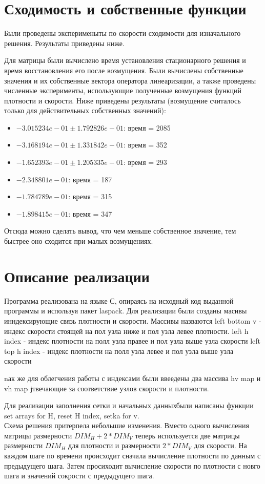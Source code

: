 \documentclass[a4paper, 25pt]{article}
\begin{document}
\newpage
\section{Сходимость и собственные функции}
Были проведены эксперименыты по скорости сходимости для изначального решения. Результаты приведены ниже.

Для матрицы были вычислено время установления стационарного решения и время восстановления его после возмущения. Были вычислены собственные значения
и их собственные вектора оператора линеаризации, а также проведены численные эксперименты, использующие полученные возмущения функций плотности и 
скорости. Ниже приведены результаты (возмущение считалось только для действительных собственных значений):
\begin{itemize}
 \item $-3.015234e-01 \pm 1.792826e-01$: время = 2085
 \item $-3.168194e-01 \pm 1.331842e-01$: время = 352
 \item $-1.652393e-01 \pm 1.205335e-01$: время = 293
 \item $-2.348801e-01$: время = 187
 \item $-1.784789e-01$: время = 315
 \item $-1.898415e-01$: время = 347 
\end{itemize}
Отсюда можно сделать вывод, что чем меньше собственное значение, тем быстрее оно сходится при малых возмущениях.
\section{Описание реализации}
Программа реализована на языке С, опираясь на исходный код выданной программы и используя пакет laspack.
Для реализации были созданы масивы инндексирующие связь плотности и скорости. Массивы назваются left bottom v - индекс скорости стоящей на пол узла ниже и пол узла левее плотности.
left h index -  индекс плотности на полл узла правее и пол узла выше узла скорости
left top h index -  индекс плотности на полл узла левее и пол узла выше узла скорости

nак же для облегчения работы с индексами были ввеедены два массива hv map и vh map jтвечающие за соответствие узлов скорости и плотности.

Для реализации заполнения сетки и начальных данныхбыли написаны функции set arrays for H, reset H index, setka for v.\\
Схема решения притерпела небольшие изменения. Вместо одного вычисления матрицы размерности $DIM_H + 2 * DIM_V$ теперь используется две матрицы размерности $DIM_H$ для плотности  и размерности $2 * DIM_V$ для скорости. На каждом шаге по времени происходит сначала вычисление плотности по данным с предыдущего шага. Затем просиходит вычисление скорости по плотности с новго шага и значений сокрости с предыдущего шага. 
\end{document}
